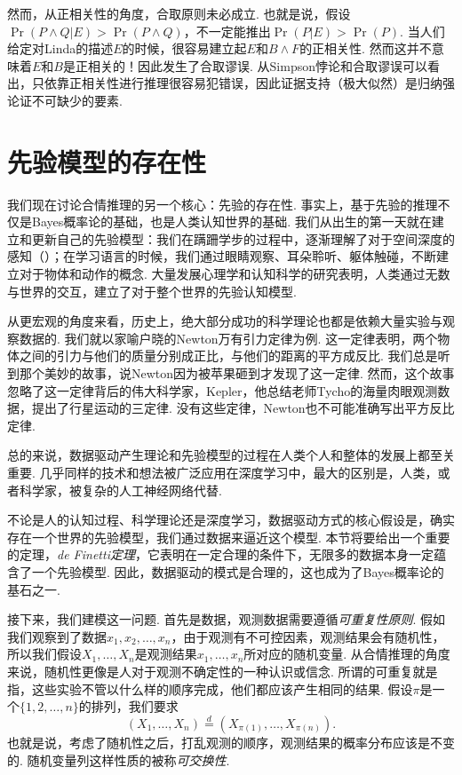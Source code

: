 然而，从正相关性的角度，合取原则未必成立. 也就是说，假设$\Pr(P\wedge Q|E)>\Pr(P\wedge Q)$，不一定能推出$\Pr(P|E)>\Pr(P)$. 当人们给定对Linda的描述$E$的时候，很容易建立起$E$和$B\wedge F$的正相关性. 然而这并不意味着$E$和$B$是正相关的！因此发生了合取谬误. 从Simpson悖论和合取谬误可以看出，只依靠正相关性进行推理很容易犯错误，因此证据支持（极大似然）是归纳强论证不可缺少的要素.

\section{先验模型的存在性}

我们现在讨论合情推理的另一个核心：先验的存在性. 事实上，基于先验的推理不仅是Bayes概率论的基础，也是人类认知世界的基础. 我们从出生的第一天就在建立和更新自己的先验模型：我们在蹒跚学步的过程中，逐渐理解了对于空间深度的感知（）；在学习语言的时候，我们通过眼睛观察、耳朵聆听、躯体触碰，不断建立对于物体和动作的概念. 大量发展心理学和认知科学的研究表明，人类通过无数与世界的交互，建立了对于整个世界的先验认知模型.

从更宏观的角度来看，历史上，绝大部分成功的科学理论也都是依赖大量实验与观察数据的. 我们就以家喻户晓的Newton万有引力定律为例. 这一定律表明，两个物体之间的引力与他们的质量分别成正比，与他们的距离的平方成反比. 我们总是听到那个美妙的故事，说Newton因为被苹果砸到才发现了这一定律. 然而，这个故事忽略了这一定律背后的伟大科学家，Kepler，他总结老师Tycho的海量肉眼观测数据，提出了行星运动的三定律. 没有这些定律，Newton也不可能准确写出平方反比定律. 

总的来说，数据驱动产生理论和先验模型的过程在人类个人和整体的发展上都至关重要. 几乎同样的技术和想法被广泛应用在深度学习中，最大的区别是，人类，或者科学家，被复杂的人工神经网络代替. 

不论是人的认知过程、科学理论还是深度学习，数据驱动方式的核心假设是，确实存在一个世界的先验模型，我们通过数据来逼近这个模型. 本节将要给出一个重要的定理，\emph{de Finetti定理}，它表明在一定合理的条件下，无限多的数据本身一定蕴含了一个先验模型. 因此，数据驱动的模式是合理的，这也成为了Bayes概率论的基石之一.

接下来，我们建模这一问题. 首先是数据，观测数据需要遵循\emph{可重复性原则}. 假如我们观察到了数据$x_1,x_2,\dots,x_n$，由于观测有不可控因素，观测结果会有随机性，所以我们假设$X_1,\dots,X_n$是观测结果$x_1,\dots,x_n$所对应的随机变量. 从合情推理的角度来说，随机性更像是人对于观测不确定性的一种认识或信念. 所谓的可重复就是指，这些实验不管以什么样的顺序完成，他们都应该产生相同的结果. 假设$\pi$是一个$\{1,2,\dots,n\}$的排列，我们要求
\[
    (X_1,\dots,X_n)\stackrel{d}{=}(X_{\pi(1)},\dots,X_{\pi(n)}).
\]
也就是说，考虑了随机性之后，打乱观测的顺序，观测结果的概率分布应该是不变的. 随机变量列这样性质的被称\emph{可交换性}. 

